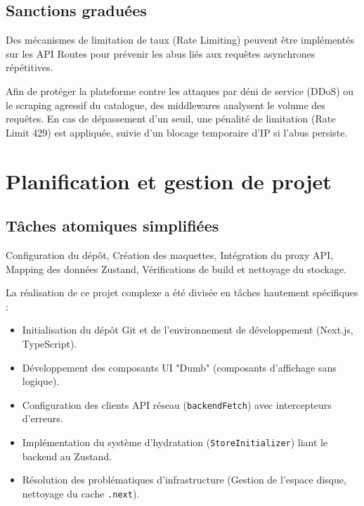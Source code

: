 \documentclass[12pt, a4paper]{report}
\begin{document}
\section{Sanctions graduées}
Des mécanismes de limitation de taux (Rate Limiting) peuvent être implémentés sur les API Routes pour prévenir les abus liés aux requêtes asynchrones répétitives.

Afin de protéger la plateforme contre les attaques par déni de service (DDoS) ou le scraping agressif du catalogue, des middlewares analysent le volume des requêtes. En cas de dépassement d'un seuil, une pénalité de limitation (Rate Limit 429) est appliquée, suivie d'un blocage temporaire d'IP si l'abus persiste.
\chapter{Planification et gestion de projet}
\section{Tâches atomiques simplifiées}
Configuration du dépôt, Création des maquettes, Intégration du proxy API, Mapping des données Zustand, Vérifications de build et nettoyage du stockage.

La réalisation de ce projet complexe a été divisée en tâches hautement spécifiques :
\begin{itemize}
    \item Initialisation du dépôt Git et de l'environnement de développement (Next.js, TypeScript).
    \item Développement des composants UI "Dumb" (composants d'affichage sans logique).
    \item Configuration des clients API réseau (\texttt{backendFetch}) avec intercepteurs d'erreurs.
    \item Implémentation du système d'hydratation (\texttt{StoreInitializer}) liant le backend au Zustand.
    \item Résolution des problématiques d'infrastructure (Gestion de l'espace disque, nettoyage du cache \texttt{.next}).
\end{itemize}
\end{document}
